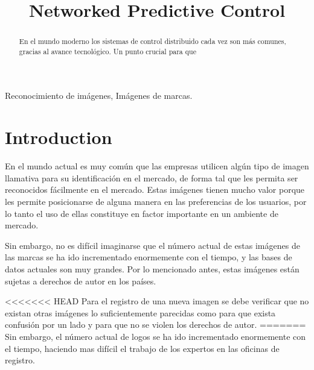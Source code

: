 \documentclass[conference]{IEEEtran}
\begin{document}
\title{Networked Predictive Control\\
}

\author{
}

\maketitle

\begin{abstract}
En el mundo moderno los sistemas de control distribuido cada vez son más comunes, gracias al avance tecnológico. Un punto crucial para que  
\end{abstract}

\begin{IEEEkeywords}
Reconocimiento de imágenes, Imágenes de marcas.
\end{IEEEkeywords}

\section{Introduction}
En el mundo actual es muy común que las empresas utilicen algún tipo de imagen llamativa para su identificación en el mercado, de forma tal que les permita ser reconocidos fácilmente en el mercado. Estas imágenes tienen mucho valor porque les permite posicionarse de alguna manera en las preferencias de los usuarios, por lo tanto el uso de ellas constituye en factor importante en un ambiente de mercado.

Sin embargo, no es difícil imaginarse que el número actual de estas imágenes de las marcas se ha ido incrementado enormemente con el tiempo, y las bases de datos actuales son muy grandes. Por lo mencionado antes, estas imágenes están sujetas a derechos de autor en los países.

<<<<<<< HEAD
Para el registro de una nueva imagen se debe verificar que no existan otras imágenes lo suficientemente parecidas como para que exista confusión por un lado y para que no se violen los derechos de autor. 
=======
Sin embargo, el número actual de logos se ha ido incrementado enormemente con el tiempo, haciendo mas difícil el trabajo de los expertos en las oficinas de registro. 
\end{document}
